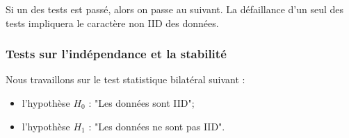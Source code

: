 Si un des tests est passé, alors on passe au suivant. La défaillance d'un seul des tests impliquera le caractère non IID des données. 


\subsubsection{Tests sur l'indépendance et la stabilité}
Nous travaillons sur le test statistique bilatéral suivant : 
\begin{itemize}
\item l'hypothèse $H_0$ : "Les données sont IID";
\item l'hypothèse $H_1$ : "Les données ne sont pas IID". \\

\end{itemize}


